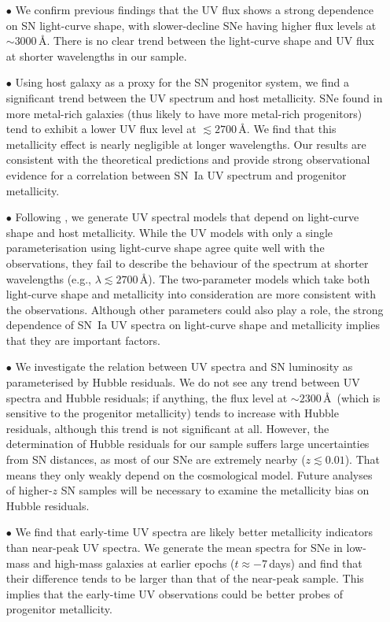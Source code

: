 \documentclass[useAMS,usenatbib]{mn2e}
\begin{document}
\begin{enumerate}
\item[$\bullet$] We confirm previous findings that the UV flux shows a strong dependence on SN light-curve shape, with slower-decline SNe having higher flux levels at $\sim3000$\,\AA. There is no clear trend between the light-curve shape and UV flux at shorter wavelengths in our sample.

\item[$\bullet$] Using host galaxy as a proxy for the SN progenitor system, we find a significant trend between the UV spectrum and host metallicity. SNe found in more metal-rich galaxies (thus likely to have more metal-rich progenitors) tend to exhibit a lower UV flux level at $\lesssim2700$\,\AA. We find that this metallicity effect is nearly negligible at longer wavelengths. Our results are consistent with the theoretical predictions and provide strong observational evidence for a correlation between SN~Ia UV spectrum and progenitor metallicity.

\item[$\bullet$] Following \citet{2016MNRAS.461.1308F}, we generate UV spectral models that depend on light-curve shape and host metallicity. While the UV models with only a single parameterisation using light-curve shape agree quite well with the observations, they fail to describe the behaviour of the spectrum at shorter wavelengths (e.g., $\lambda\lesssim2700$\,\AA). The two-parameter models which take both light-curve shape and metallicity into consideration are more consistent with the observations. Although other parameters could also play a role, the strong dependence of SN~Ia UV spectra on light-curve shape and metallicity implies that they are important factors.

\item[$\bullet$] We investigate the relation between UV spectra and SN luminosity as parameterised by Hubble residuals. We do not see any trend between UV spectra and Hubble residuals; if anything, the flux level at $\sim2300$\,\AA\ (which is sensitive to the progenitor metallicity) tends to increase with Hubble residuals, although this trend is not significant at all. However, the determination of Hubble residuals for our sample suffers large uncertainties from SN distances, as most of our SNe are extremely nearby ($z\lesssim0.01$). That means they only weakly depend on the cosmological model. Future analyses of higher-$z$ SN samples will be necessary to examine the metallicity bias on Hubble residuals.

\item[$\bullet$] We find that early-time UV spectra are likely better metallicity indicators than near-peak UV spectra. We generate the mean spectra for SNe in low-mass and high-mass galaxies at earlier epochs ($t \approx -7$\,days) and find that their difference tends to be larger than that of the near-peak sample. This implies that the early-time UV observations could be better probes of progenitor metallicity.
\end{enumerate} 
\end{document}
